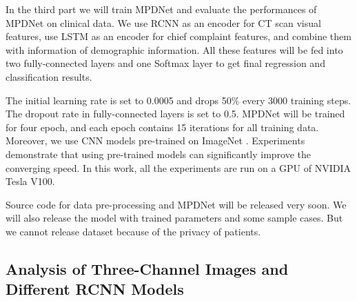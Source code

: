 \documentclass[journal]{IEEEtran}
\begin{document}
In the third part we will train MPDNet and evaluate the performances of MPDNet on clinical data. We use RCNN as an encoder for CT scan visual features, use LSTM as an encoder for chief complaint features, and combine them with information of demographic information. All these features will be fed into two fully-connected layers and one Softmax layer to get final regression and classification results. 

The initial learning rate is set to 0.0005 and drops 50\% every 3000 training steps. The dropout rate in fully-connected layers is set to 0.5. MPDNet will be trained for four epoch, and each epoch contains 15 iterations for all training data. Moreover, we use CNN models pre-trained on ImageNet \cite{ILSVRC15}. Experiments demonstrate that using pre-trained models can significantly improve the converging speed. In this work, all the experiments are run on a GPU of NVIDIA Tesla V100. 

Source code for data pre-processing and MPDNet will be released very soon. We will also release the model with trained parameters and some sample cases. But we cannot release dataset because of the privacy of patients. 

\subsection{Analysis of Three-Channel Images and Different RCNN Models}
\label{effectiveness}
\end{document}
